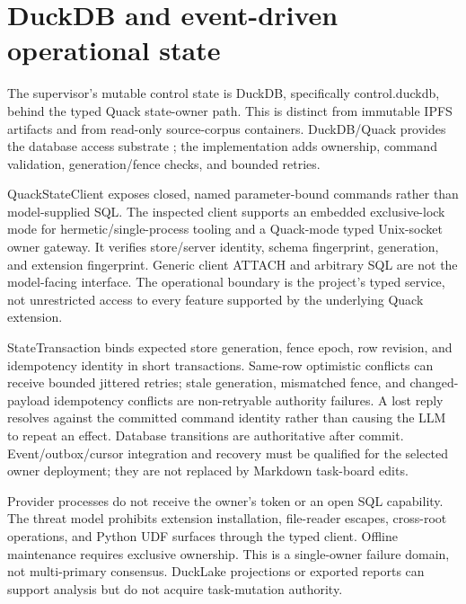 \documentclass{article}
\begin{document}
\section{DuckDB and event-driven operational state}

The supervisor's mutable control state is DuckDB, specifically control.duckdb, behind the typed Quack state-owner path. This is distinct from immutable IPFS artifacts and from read-only source-corpus containers. DuckDB/Quack provides the database access substrate \citep{quack}; the implementation adds ownership, command validation, generation/fence checks, and bounded retries.

QuackStateClient exposes closed, named parameter-bound commands rather than model-supplied SQL. The inspected client supports an embedded exclusive-lock mode for hermetic/single-process tooling and a Quack-mode typed Unix-socket owner gateway. It verifies store/server identity, schema fingerprint, generation, and extension fingerprint. Generic client ATTACH and arbitrary SQL are not the model-facing interface. The operational boundary is the project's typed service, not unrestricted access to every feature supported by the underlying Quack extension.

StateTransaction binds expected store generation, fence epoch, row revision, and idempotency identity in short transactions. Same-row optimistic conflicts can receive bounded jittered retries; stale generation, mismatched fence, and changed-payload idempotency conflicts are non-retryable authority failures. A lost reply resolves against the committed command identity rather than causing the LLM to repeat an effect. Database transitions are authoritative after commit. Event/outbox/cursor integration and recovery must be qualified for the selected owner deployment; they are not replaced by Markdown task-board edits.

Provider processes do not receive the owner's token or an open SQL capability. The threat model prohibits extension installation, file-reader escapes, cross-root operations, and Python UDF surfaces through the typed client. Offline maintenance requires exclusive ownership. This is a single-owner failure domain, not multi-primary consensus. DuckLake projections or exported reports can support analysis but do not acquire task-mutation authority.
\end{document}
